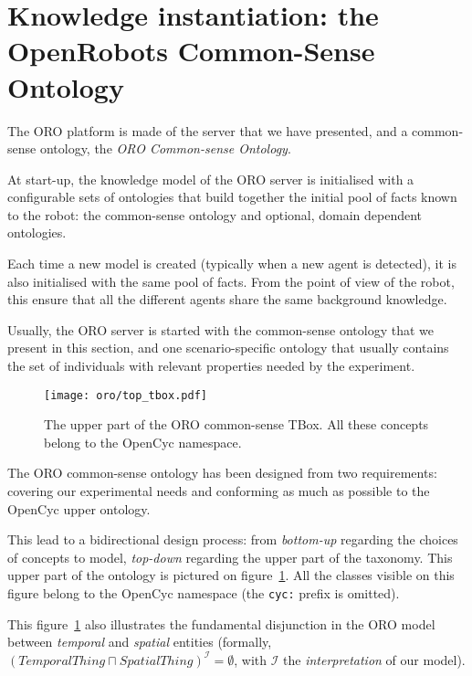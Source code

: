 \section{Knowledge instantiation: the OpenRobots Common-Sense Ontology}
\label{sect|oro-commonsense}

The ORO platform is made of the server that we have presented, and a
common-sense ontology, the \emph{ORO Common-sense Ontology}.

At start-up, the knowledge model of the ORO server is initialised with a
configurable sets of ontologies that build together the initial pool of facts
known to the robot: the common-sense ontology and optional, domain dependent
ontologies.

Each time a new model is created (typically when a new agent is detected), it
is also initialised with the same pool of facts.  From the point of view of the
robot, this ensure that all the different agents share the same background
knowledge.

Usually, the ORO server is started with the common-sense ontology that we
present in this section, and one scenario-specific ontology that usually
contains the set of individuals with relevant properties needed by the
experiment.

\begin{figure}
    \centering
    \texttt{[image: oro/top\_tbox.pdf]}

    \caption{The upper part of the ORO common-sense TBox. All these concepts
    belong to the {\sc OpenCyc} namespace.}
    
    \label{fig|upper_tbox}
\end{figure}

The ORO common-sense ontology has been designed from two requirements: covering
our experimental needs and conforming as much as possible to the {\sc OpenCyc}
upper ontology.

This lead to a bidirectional design process: from \emph{bottom-up} regarding
the choices of concepts to model, \emph{top-down} regarding the upper part of the
taxonomy. This upper part of the ontology is pictured on
figure~\ref{fig|upper_tbox}. All the classes visible on this figure belong to the
{\sc OpenCyc} namespace (the {\tt cyc:} prefix is omitted).

This figure~\ref{fig|upper_tbox} also illustrates the fundamental disjunction
in the ORO model between \emph{temporal} and \emph{spatial} entities (formally,
$(TemporalThing \sqcap SpatialThing)^{\mathcal{I}} = \emptyset$, with
$\mathcal{I}$ the \emph{interpretation} of our model).

